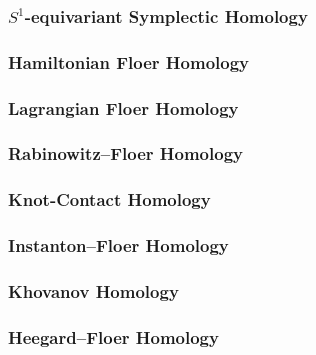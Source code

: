 \documentclass[a4paper]{article}
\theoremstyle{definition}
\theoremstyle{definition}
\theoremstyle{remark}
\theoremstyle{remark}
\theoremstyle{remark}
\begin{document}
\subsubsection{$S^1$-equivariant Symplectic Homology}

\subsubsection{Hamiltonian Floer Homology}

\subsubsection{Lagrangian Floer Homology}

\subsubsection{Rabinowitz--Floer Homology}

\subsubsection{Knot-Contact Homology}

\subsubsection{Instanton--Floer Homology}

\subsubsection{Khovanov Homology}

\subsubsection{Heegard--Floer Homology}

{}

\end{document}
